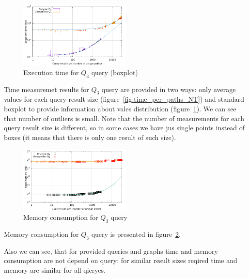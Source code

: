 \begin{figure}[h!]
  \begin{center}
    \includegraphics[width=0.5\textwidth]{data/time_per_paths_NT_boxplot.pdf}
    \caption{Execution time for $Q_3$ query (boxplot)}
    \label{fig:time_per_paths_NT_boxplot}
  \end{center}
\end{figure}


Time measuremet results for $Q_3$ query are provided in two ways: only average values for each query result size (figure~\ref{fig:time_per_paths_NT}) and standard boxplot to provide information about vales distribution (figure~\ref{fig:time_per_paths_NT_boxplot}). We can see that number of outliers is small. Note that the number of measurements for each query result size is different, so in some cases we have jus single points instead of boxes (it means that there is only one result of such size).


\begin{figure}[h!]
  \begin{center}
    \includegraphics[width=0.5\textwidth]{data/mem_per_paths_NT.pdf}
    \caption{Memory consumption for $Q_3$ query}
    \label{fig:mem_per_paths_NT}
  \end{center}
\end{figure}

Memory consumption for $Q_3$ query is presented in figure~\ref{fig:mem_per_paths_NT}.

Also we can see, that for provided queries and graphs time and memory consumption are not depend on query: for similar result sizes reqired time and memory are similar for all qieryes.